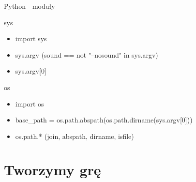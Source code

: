 \documentclass{beamer}
\begin{document}
\begin{frame}{Python - moduły}
  \begin{block}{sys}
    \begin{itemize}
    \item import sys
    \item sys.argv (sound == not "--nosound" in sys.argv)
    \item sys.argv[0]
    \end{itemize}
  \end{block}

  \begin{block}{os}
    \begin{itemize}
    \item import os
    \item base\_path = os.path.abspath(os.path.dirname(sys.argv[0]))
    \item os.path.* (join, abspath, dirname, isfile)
    \end{itemize}
  \end{block}

\end{frame}


\section{Tworzymy grę}
\end{document}
